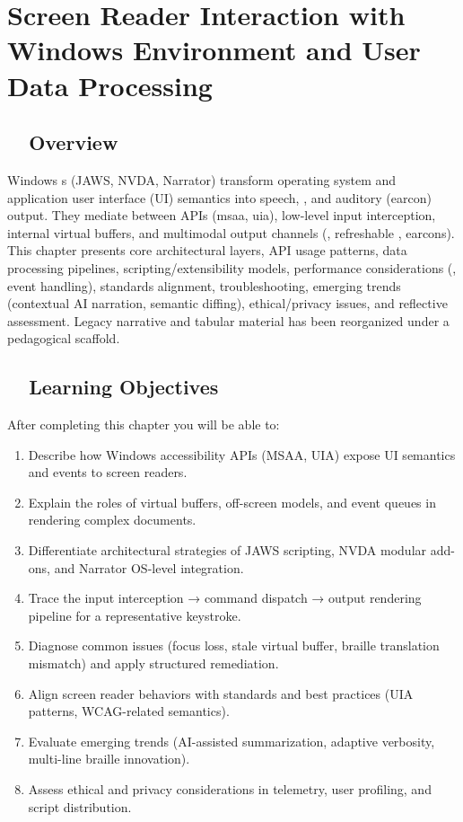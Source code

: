 \chapter{Screen Reader Interaction with Windows Environment and User Data Processing}
\label{chap:windows-screen-reader-architecture}

\section{~~Overview}
\label{sec:sr-overview}
Windows s (JAWS, NVDA, Narrator) transform operating system and application user interface (UI) semantics into speech, , and auditory (earcon) output. They mediate between  APIs (\gls{msaa}, \gls{uia}), low-level input interception, internal virtual buffers, and multimodal output channels (, refreshable , earcons). This chapter presents core architectural layers, API usage patterns, data processing pipelines, scripting/extensibility models, performance considerations (, event handling), standards alignment, troubleshooting, emerging trends (contextual AI narration, semantic diffing), ethical/privacy issues, and reflective assessment. Legacy narrative and tabular material has been reorganized under a pedagogical scaffold.

\section{~~Learning Objectives}
\label{sec:sr-learning-objectives}
After completing this chapter you will be able to:
\begin{enumerate}
	\item Describe how Windows accessibility APIs (MSAA, UIA) expose UI semantics and events to screen readers.
	\item Explain the roles of virtual buffers, off-screen models, and event queues in rendering complex documents.
	\item Differentiate architectural strategies of JAWS scripting, NVDA modular add-ons, and Narrator OS-level integration.
	\item Trace the input interception → command dispatch → output rendering pipeline for a representative keystroke.
	\item Diagnose common issues (focus loss, stale virtual buffer, braille translation mismatch) and apply structured remediation.
	\item Align screen reader behaviors with standards and best practices (UIA patterns, WCAG-related semantics).
	\item Evaluate emerging trends (AI-assisted summarization, adaptive verbosity, multi-line braille innovation).
	\item Assess ethical and privacy considerations in telemetry, user profiling, and script distribution.
\end{enumerate}

